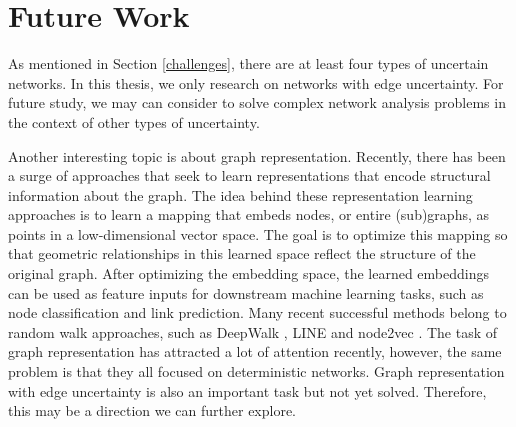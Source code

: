 \documentclass[\main/thesis.tex]{subfiles}
\begin{document}

\newpage

\section{Future Work}
As mentioned in Section \ref{challenges}, there are at least four types of uncertain networks. In this thesis, we only research on networks with edge uncertainty. For future study, we may can consider to solve complex network analysis problems in the context of other types of uncertainty.

Another interesting topic is about graph representation. Recently, there has been a surge of approaches that seek to learn representations that encode structural information about the graph. The idea behind these representation learning approaches is to learn a mapping that embeds nodes, or entire (sub)graphs, as points in a low-dimensional vector space. The goal is to optimize this mapping so that geometric relationships in this learned space reflect the structure of the original graph. After optimizing the embedding space, the learned embeddings can be used as feature inputs for downstream machine learning tasks, such as node classification and link prediction. Many recent successful methods belong to random walk approaches, such as DeepWalk \cite{perozzi2014deepwalk}, LINE \cite{tang2015line} and node2vec \cite{grover2016node2vec}. The task of graph representation has attracted a lot of attention recently, however, the same problem is that they all focused on deterministic networks. Graph representation with edge uncertainty is also an important task but not yet solved. Therefore, this may be a direction we can further explore.

\end{document}
